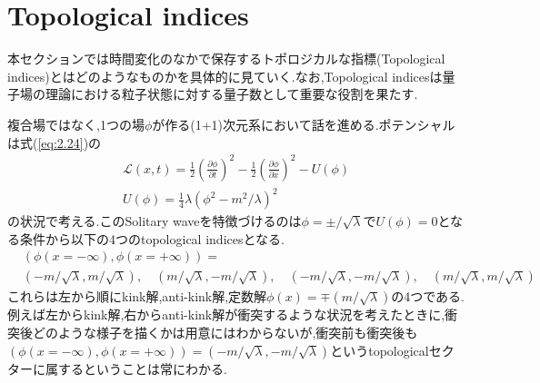 \documentclass[dvipdfmx,11pt,a4paper,oneside,openany]{jsbook}
\begin{document}
\section{Topological indices}
本セクションでは時間変化のなかで保存するトポロジカルな指標(Topological indices)とはどのようなものかを具体的に見ていく.なお,Topological indicesは量子場の理論における粒子状態に対する量子数として重要な役割を果たす.

複合場ではなく,1つの場$\phi$が作る(1+1)次元系において話を進める.ポテンシャルは式(\ref{eq:2.24})の
\begin{align*}
    \mathscr{L}(x, t)=\frac{1}{2}\left(\frac{\partial \phi}{\partial t}\right)^{2}-\frac{1}{2}\left(\frac{\partial \phi}{\partial x}\right)^{2}-U(\phi)\nonumber \\
    U(\phi)=\frac{1}{4}\lambda(\phi^2-m^2/\lambda)^2
\end{align*}
の状況で考える.このSolitary waveを特徴づけるのは$\phi=\pm/\sqrt{\lambda}$で$U(\phi)=0$となる条件から以下の4つのtopological indicesとなる.
\begin{align}
     & \left(\phi(x=-\infty),\phi(x=+\infty)\right)=\nonumber                                                                                                                \\
     & (-m/\sqrt{\lambda},m/\sqrt{\lambda}),\quad (m/\sqrt{\lambda},-m/\sqrt{\lambda}),\quad (-m/\sqrt{\lambda},-m/\sqrt{\lambda}),\quad (m/\sqrt{\lambda},m/\sqrt{\lambda})
\end{align}
これらは左から順にkink解,anti-kink解,定数解$\phi(x)=\mp(m/\sqrt{\lambda})$の4つである.例えば左からkink解,右からanti-kink解が衝突するような状況を考えたときに,衝突後どのような様子を描くかは用意にはわからないが,衝突前も衝突後も$\left(\phi(x=-\infty),\phi(x=+\infty)\right)=(-m/\sqrt{\lambda},-m/\sqrt{\lambda})$というtopologicalセクターに属するということは常にわかる.
\end{document}
